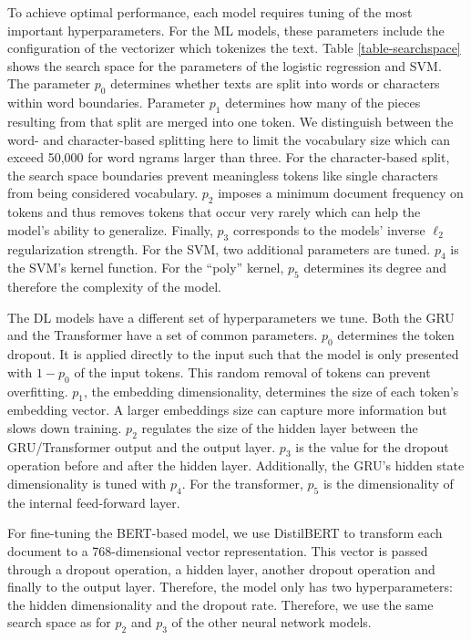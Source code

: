 

To achieve optimal performance, each model requires tuning of the most important hyperparameters. For the ML models, these parameters include the configuration of the vectorizer which tokenizes the text. Table \ref{table-searchspace} shows the search space for the parameters of the logistic regression and SVM. The parameter $p_0$ determines whether texts are split into words or characters within word boundaries. Parameter $p_1$ determines how many of the pieces resulting from that split are merged into one token. We distinguish between the word- and character-based splitting here to limit the vocabulary size which can exceed 50,000 for word ngrams larger than three. For the character-based split, the search space boundaries prevent meaningless tokens like single characters from being considered vocabulary. $p_2$ imposes a minimum document frequency on tokens and thus removes tokens that occur very rarely which can help the model's ability to generalize. Finally, $p_3$ corresponds to the models' inverse $\ell_2$ regularization strength. For the SVM, two additional parameters are tuned. $p_4$ is the SVM's kernel function. For the ``poly'' kernel, $p_5$ determines its degree and therefore the complexity of the model.



The DL models have a different set of hyperparameters we tune. Both the GRU and the Transformer have a set of common parameters. $p_0$ determines the token dropout. It is applied directly to the input such that the model is only presented with $1 - p_0$ of the input tokens. This random removal of tokens can prevent overfitting. $p_1$, the embedding dimensionality, determines the size of each token's embedding vector. A larger embeddings size can capture more information but slows down training. $p_2$ regulates the size of the hidden layer between the GRU/Transformer output and the output layer. $p_3$ is the value for the dropout operation before and after the hidden layer. Additionally, the GRU's hidden state dimensionality is tuned with $p_4$. For the transformer, $p_5$ is the dimensionality of the internal feed-forward layer.


For fine-tuning the BERT-based model, we use DistilBERT  to transform each document to a 768-dimensional vector representation. This vector is passed through a dropout operation, a hidden layer, another dropout operation and finally to the output layer. Therefore, the model only has two hyperparameters: the hidden dimensionality and the dropout rate. Therefore, we use the same search space as for $p_2$ and $p_3$ of the other neural network models.

